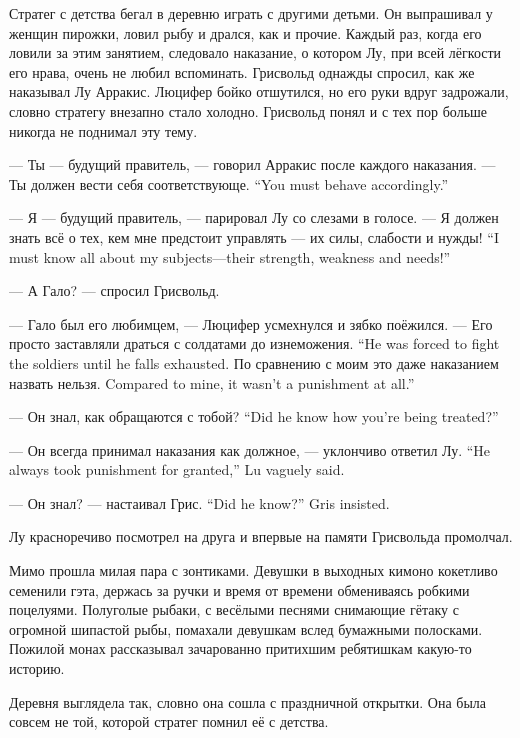 Стратег с детства бегал в деревню играть с другими детьми.
Он выпрашивал у женщин пирожки, ловил рыбу и дрался, как и прочие.
Каждый раз, когда его ловили за этим занятием, следовало наказание, о котором Лу, при всей лёгкости его нрава, очень не любил вспоминать.
Грисвольд однажды спросил, как же наказывал Лу Арракис.
Люцифер бойко отшутился, но его руки вдруг задрожали, словно стратегу внезапно стало холодно.
Грисвольд понял и с тех пор больше никогда не поднимал эту тему.

--- Ты --- будущий правитель, --- говорил Арракис после каждого наказания.
{--- Ты должен вести себя соответствующе.}
{``You must behave accordingly.''}

--- Я --- будущий правитель, --- парировал Лу со слезами в голосе.
{--- Я должен знать всё о тех, кем мне предстоит управлять --- их силы, слабости и нужды!}
{``I must know all about my subjects---their strength, weakness and needs!''}

--- А Гало? --- спросил Грисвольд.

--- Гало был его любимцем, --- Люцифер усмехнулся и зябко поёжился.
{--- Его просто заставляли драться с солдатами до изнеможения.}
{``He was forced to fight the soldiers until he falls exhausted.}
{По сравнению с моим это даже наказанием назвать нельзя.}
{Compared to mine, it wasn't a punishment at all.''}

{--- Он знал, как обращаются с тобой?}
{``Did he know how you're being treated?''}

{--- Он всегда принимал наказания как должное, --- уклончиво ответил Лу.}
{``He always took punishment for granted,'' Lu vaguely said.}

{--- Он знал? --- настаивал Грис.}
{``Did he know?'' Gris insisted.}

Лу красноречиво посмотрел на друга и впервые на памяти Грисвольда промолчал.

Мимо прошла милая пара с зонтиками.
Девушки в выходных кимоно кокетливо семенили гэта, держась за ручки и время от времени обмениваясь робкими поцелуями.
Полуголые рыбаки, с весёлыми песнями снимающие гётаку\FM{} с огромной шипастой рыбы, помахали девушкам вслед бумажными полосками.
Пожилой монах рассказывал зачарованно притихшим ребятишкам какую-то историю.

Деревня выглядела так, словно она сошла с праздничной открытки.
Она была совсем не той, которой стратег помнил её с детства.

